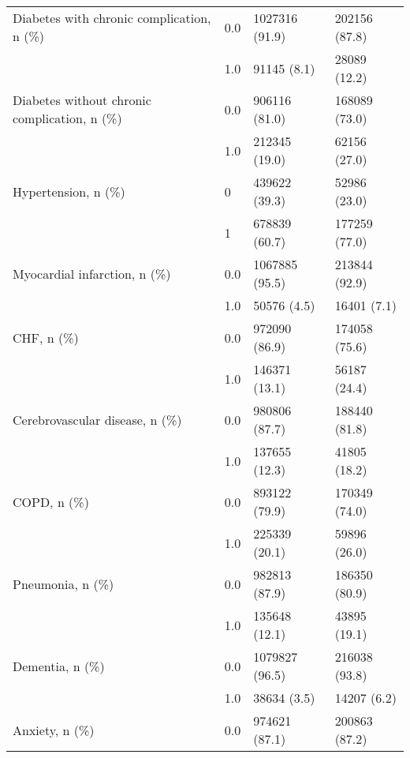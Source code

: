\begin{tabular}{llll}
Diabetes with chronic complication, n (\%) & 0.0 &                        1027316 (91.9) &     202156 (87.8) \\
                                       & 1.0 &                           91145 (8.1) &      28089 (12.2) \\
Diabetes without chronic complication, n (\%) & 0.0 &                         906116 (81.0) &     168089 (73.0) \\
                                       & 1.0 &                         212345 (19.0) &      62156 (27.0) \\
Hypertension, n (\%) & 0 &                         439622 (39.3) &      52986 (23.0) \\
                                       & 1 &                         678839 (60.7) &     177259 (77.0) \\
Myocardial infarction, n (\%) & 0.0 &                        1067885 (95.5) &     213844 (92.9) \\
                                       & 1.0 &                           50576 (4.5) &       16401 (7.1) \\
CHF, n (\%) & 0.0 &                         972090 (86.9) &     174058 (75.6) \\
                                       & 1.0 &                         146371 (13.1) &      56187 (24.4) \\
Cerebrovascular disease, n (\%) & 0.0 &                         980806 (87.7) &     188440 (81.8) \\
                                       & 1.0 &                         137655 (12.3) &      41805 (18.2) \\
COPD, n (\%) & 0.0 &                         893122 (79.9) &     170349 (74.0) \\
                                       & 1.0 &                         225339 (20.1) &      59896 (26.0) \\
Pneumonia, n (\%) & 0.0 &                         982813 (87.9) &     186350 (80.9) \\
                                       & 1.0 &                         135648 (12.1) &      43895 (19.1) \\
Dementia, n (\%) & 0.0 &                        1079827 (96.5) &     216038 (93.8) \\
                                       & 1.0 &                           38634 (3.5) &       14207 (6.2) \\
Anxiety, n (\%) & 0.0 &                         974621 (87.1) &     200863 (87.2) \\

\end{tabular}
